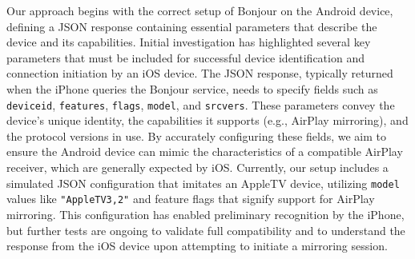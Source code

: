   Our approach begins with the correct setup of Bonjour on the Android device, defining a JSON response containing essential parameters that describe the device and its capabilities. Initial investigation has highlighted several key parameters that must be included for successful device identification and connection initiation by an iOS device.
  The JSON response, typically returned when the iPhone queries the Bonjour service, needs to specify fields such as \texttt{deviceid}, \texttt{features}, \texttt{flags}, \texttt{model}, and \texttt{srcvers}. These parameters convey the device's unique identity, the capabilities it supports (e.g., AirPlay mirroring), and the protocol versions in use. By accurately configuring these fields, we aim to ensure the Android device can mimic the characteristics of a compatible AirPlay receiver, which are generally expected by iOS.
  Currently, our setup includes a simulated JSON configuration that imitates an AppleTV device, utilizing \texttt{model} values like \texttt{"AppleTV3,2"} and feature flags that signify support for AirPlay mirroring. This configuration has enabled preliminary recognition by the iPhone, but further tests are ongoing to validate full compatibility and to understand the response from the iOS device upon attempting to initiate a mirroring session.